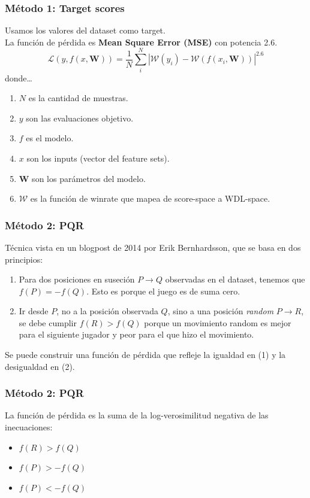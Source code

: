 \begin{frame}
\frametitle{Método 1: Target scores}
Usamos los valores del dataset como target. \pause \\ La función de pérdida es \textbf{Mean Square Error (MSE)} con potencia 2.6.
\[
\mathcal{L}(y,f(x,\bm{W}))= \frac{1}{N} \sum_i^N \left| \mathcal{W}(y_i) - \mathcal{W}(f(x_i,\bm{W})) \right| ^{2.6}
\]
donde\dots

\begin{enumerate}
\itemsep0em
\item $N$ es la cantidad de muestras.
\item $y$ son las evaluaciones objetivo.
\item $f$ es el modelo.
\item $x$ son los inputs (vector del feature sets).
\item $\bm{W}$ son los parámetros del modelo.
\item $\mathcal{W}$ es la función de winrate que mapea de score-space a WDL-space.
\end{enumerate}
\end{frame}


\begin{frame}
\frametitle{Método 2: PQR}
Técnica vista en un blogpost de 2014 por Erik Bernhardsson, que se basa en dos principios: \pause \\
\begin{enumerate}
\item Para dos posiciones en suseción $P \rightarrow Q$ observadas en el dataset, tenemos que \mbox{$f(P)=-f(Q)$}. Esto es porque el juego es de suma cero. \pause
\item Ir desde $P$, no a la posición observada $Q$, sino a una posición \textit{random} $P \rightarrow R$, se debe cumplir $f(R) > f(Q)$ porque un movimiento random es mejor para el siguiente jugador y peor para el que hizo el movimiento.
\end{enumerate}
\pause
Se puede construir una función de pérdida que refleje la igualdad en (1) y la desigualdad en (2).
\end{frame}


\begin{frame}
\frametitle{Método 2: PQR}
La función de pérdida es la suma de la log-verosimilitud negativa de las inecuaciones:
\begin{itemize}
\item ${f(R) > f(Q)}$
\item ${f(P) > - f(Q)}$
\item ${f(P) < -f(Q)}$
\end{itemize}
\end{frame}

